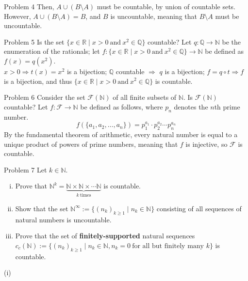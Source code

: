 \documentclass[10pt]{extarticle}
\begin{document}
{\begin{problem}{Problem 4}
    Then, $A\cup (B\setminus A)$ must be countable, by union of countable sets.\\

    However, $A\cup (B\setminus A) = B$, and $B$ is uncountable, meaning that $B\setminus A$ must be uncountable.
  \end{problem}
  \begin{problem}{Problem 5}
    Is the set $\{x\in\mathbb{R} \mid x>0~\textrm{and}~x^2\in\mathbb{Q}\}$ countable?
    \tcblower
    Let $q: \mathbb{Q} \rightarrow \mathbb{N}$ be the enumeration of the rationals; let $f:\{x\in\mathbb{R} \mid x>0~\textrm{and}~x^2\in\mathbb{Q}\} \rightarrow \mathbb{N}$ be defined as $f(x) = q\left(x^2\right)$.\\

    $x>0 \Rightarrow t(x) = x^2$ is a bijection; $\mathbb{Q}$ countable $\Rightarrow$ $q$ is a bijection; $f = q\circ t \Rightarrow f$ is a bijection, and thus $\{x\in\mathbb{R}\mid x>0~\textrm{and}~x^2\in\mathbb{Q}\}$ is countable.
  \end{problem}
  \begin{problem}{Problem 6}
    Consider the set $\mathcal{F}(\mathbb{N})$ of all finite subsets of $\mathbb{N}$. Is $\mathcal{F}(\mathbb{N})$ countable?
    \tcblower
    Let $f: \mathcal{F} \rightarrow \mathbb{N}$ be defined as follows, where $p_n$ denotes the $n$th prime number.
    \[
      f(\{a_1,a_2,\dots,a_n\}) = p_1^{a_1}\cdot p_2^{a_2}\cdots p_{n}^{a_n}
    \] 
    By the fundamental theorem of arithmetic, every natural number is equal to a unique product of powers of prime numbers, meaning that $f$ is injective, so $\mathcal{F}$ is countable.
  \end{problem}
  \begin{problem}{Problem 7}
    Let $k\in\mathbb{N}$.
    \begin{enumerate}[(i)]
      \item Prove that $\mathbb{N}^k = \underbrace{\mathbb{N}\times\mathbb{N}\times\cdots\mathbb{N}}_{k~\textrm{times}}$ is countable.
      \item Show that the set $\mathbb{N}^{\infty} := \{(n_k)_{k\geq 1}\mid n_k\in \mathbb{N}\}$ consisting of all sequences of natural numbers is uncountable.
      \item Prove that the set of \textbf{finitely-supported} natural sequences $c_c(\mathbb{N}) := \{(n_k)_{k\geq 1} \mid n_k\in\mathbb{N}, n_k=0~\text{for all but finitely many }k\}$ is countable.
    \end{enumerate}
    \tcblower
    \begin{problem}{(i)}

\end{problem}
\end{problem}}
\end{document}
